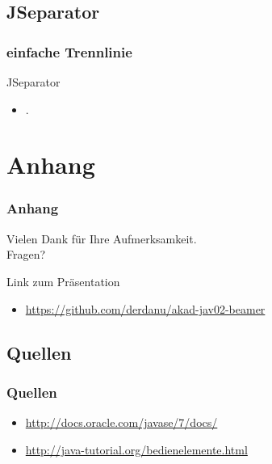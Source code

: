 \documentclass[xcolor=dvipsnames]{beamer}
\begin{document}
\subsection{JSeparator}
\begin{frame} %
  \frametitle{einfache Trennlinie
} %
  \begin{block}{JSeparator}
	  \begin{itemize}
		\item .
	  \end{itemize}
  \end{block}
\end{frame}



\section{Anhang}
\begin{frame}
  \frametitle{Anhang} %
	\begin{block}{}	
		\begin{center}
			Vielen Dank für Ihre Aufmerksamkeit. \\
			Fragen?
		\end{center}	
	\end{block}
	\begin{block}{Link zum Präsentation}	
		\begin{itemize}
			\item \url{https://github.com/derdanu/akad-jav02-beamer}
		\end{itemize}
	\end{block}
\end{frame}

\subsection{Quellen}
\begin{frame} %
  \frametitle{Quellen} %
 	\begin{itemize}
		\item \url{http://docs.oracle.com/javase/7/docs/}	
		\item \url{http://java-tutorial.org/bedienelemente.html}
	\end{itemize}
\end{frame}
\end{document}
